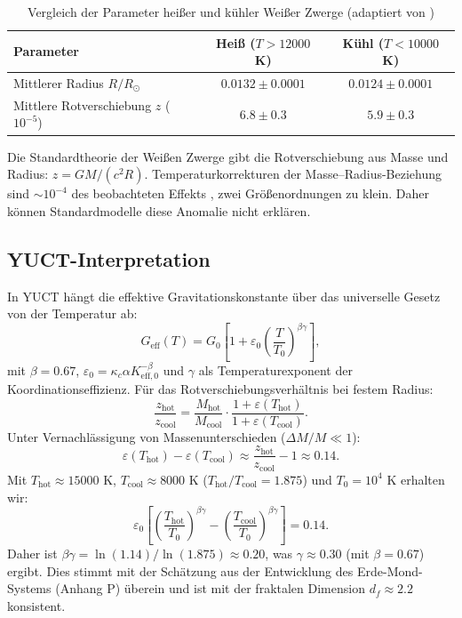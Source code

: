 \documentclass[12pt,a4paper]{article}
\theoremstyle{remark}
\newcommand{\df}{d_{\!f}}
\newcommand{\kappac}{\kappa_c}
\newcommand{\alp}{\alpha}
\newcommand{\eps}{\varepsilon}
\begin{document}
	\begin{table}[h]
		\centering
		\caption{Vergleich der Parameter heißer und kühler Weißer Zwerge (adaptiert von \cite{Crumpler2024})}
		\label{tab:wd-results}
		\begin{tabular}{lcc}
			\toprule
			\textbf{Parameter} & \textbf{Heiß (\(T>12000\) K)} & \textbf{Kühl (\(T<10000\) K)} \\
			\midrule
			Mittlerer Radius \(R/R_\odot\) & \(0.0132 \pm 0.0001\) & \(0.0124 \pm 0.0001\) \\
			Mittlere Rotverschiebung \(z\) (\(10^{-5}\)) & \(6.8 \pm 0.3\) & \(5.9 \pm 0.3\) \\
			\bottomrule
		\end{tabular}
	\end{table}
	
	Die Standardtheorie der Weißen Zwerge gibt die Rotverschiebung aus Masse und Radius: \(z = GM/(c^2 R)\). Temperaturkorrekturen der Masse–Radius-Beziehung sind \(\sim 10^{-4}\) des beobachteten Effekts \cite{Fontaine2001}, zwei Größenordnungen zu klein. Daher können Standardmodelle diese Anomalie nicht erklären.
	
	\subsection{YUCT-Interpretation}
	\label{subsec:wd-yuct-interp}
	
	In YUCT hängt die effektive Gravitationskonstante über das universelle Gesetz von der Temperatur ab:
	\[
	G_{\mathrm{eff}}(T) = G_0\left[1 + \eps_0 \left(\frac{T}{T_0}\right)^{\beta\gamma}\right],
	\]
	mit \(\beta = 0.67\), \(\eps_0 = \kappac \alp K_{\mathrm{eff},0}^{-\beta}\) und \(\gamma\) als Temperaturexponent der Koordinationseffizienz. Für das Rotverschiebungsverhältnis bei festem Radius:
	\[
	\frac{z_{\mathrm{hot}}}{z_{\mathrm{cool}}} = \frac{M_{\mathrm{hot}}}{M_{\mathrm{cool}}} \cdot \frac{1 + \eps(T_{\mathrm{hot}})}{1 + \eps(T_{\mathrm{cool}})}.
	\]
	Unter Vernachlässigung von Massenunterschieden (\(\Delta M/M \ll 1\)):
	\[
	\eps(T_{\mathrm{hot}}) - \eps(T_{\mathrm{cool}}) \approx \frac{z_{\mathrm{hot}}}{z_{\mathrm{cool}}} - 1 \approx 0.14.
	\]
	Mit \(T_{\mathrm{hot}} \approx 15000\) K, \(T_{\mathrm{cool}} \approx 8000\) K (\(T_{\mathrm{hot}}/T_{\mathrm{cool}} = 1.875\)) und \(T_0 = 10^4\) K erhalten wir:
	\[
	\eps_0 \left[\left(\frac{T_{\mathrm{hot}}}{T_0}\right)^{\beta\gamma} - \left(\frac{T_{\mathrm{cool}}}{T_0}\right)^{\beta\gamma}\right] = 0.14.
	\]
	Daher ist \(\beta\gamma = \ln(1.14)/\ln(1.875) \approx 0.20\), was \(\gamma \approx 0.30\) (mit \(\beta = 0.67\)) ergibt. Dies stimmt mit der Schätzung aus der Entwicklung des Erde-Mond-Systems \cite{Lantink2022, Farhat2022} (Anhang P) überein und ist mit der fraktalen Dimension \(\df \approx 2.2\) konsistent.
	
\end{document}
